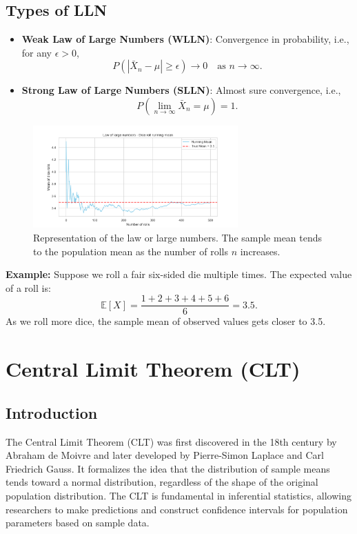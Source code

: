 \documentclass{book}
\begin{document}
\subsection{Types of LLN}
\begin{itemize}
    \item \textbf{Weak Law of Large Numbers (WLLN)}: Convergence in probability, i.e., for any $\epsilon > 0$, 
    \begin{equation}
        P(|\bar{X}_n - \mu| \geq \epsilon) \to 0 \quad \text{as } n \to \infty.
    \end{equation}
    \item \textbf{Strong Law of Large Numbers (SLLN)}: Almost sure convergence, i.e.,
    \begin{equation}
        P\left( \lim_{n \to \infty} \bar{X}_n = \mu \right) = 1.
    \end{equation}
\end{itemize}

\begin{figure}[ht]
    \centering
    \includegraphics[width=0.7\textwidth]{figures/chapter3/law_large_numbers.png}
    \caption{Representation of the law or large numbers. The sample mean tends to the population mean as the number of rolls $n$ increases.}
    \label{fig:random}
\end{figure}

\textbf{Example:} Suppose we roll a fair six-sided die multiple times. The expected value of a roll is:
\begin{equation}
    \mathbb{E}[X] = \frac{1+2+3+4+5+6}{6} = 3.5.
\end{equation}
As we roll more dice, the sample mean of observed values gets closer to 3.5.

\newpage

\section{Central Limit Theorem (CLT)}

\subsection*{Introduction}
The Central Limit Theorem (CLT) was first discovered in the 18th century by Abraham de Moivre and later developed by Pierre-Simon Laplace and Carl Friedrich Gauss. It formalizes the idea that the distribution of sample means tends toward a normal distribution, regardless of the shape of the original population distribution. The CLT is fundamental in inferential statistics, allowing researchers to make predictions and construct confidence intervals for population parameters based on sample data.
\end{document}
